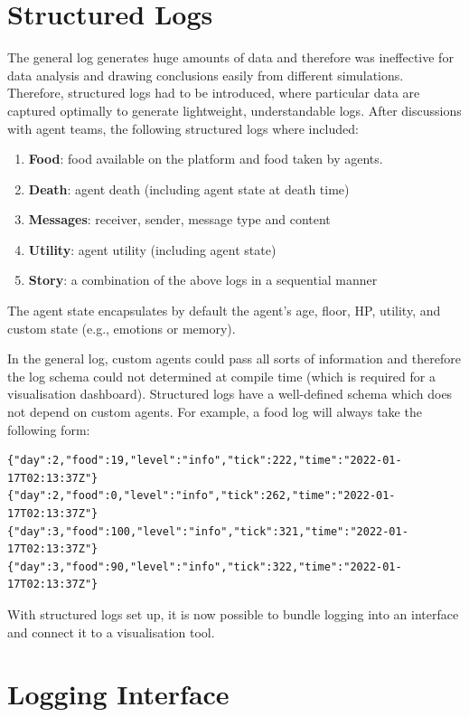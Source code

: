 \begin{multicols}{2}
\section{Structured Logs}

The general log generates huge amounts of data and therefore was ineffective for data analysis and drawing conclusions easily from different simulations. Therefore, structured logs had to be introduced, where particular data are captured optimally to generate lightweight, understandable logs. After discussions with agent teams, the following structured logs where included:

\begin{enumerate}
    \item \textbf{Food}: food available on the platform and food taken by agents.
    \item \textbf{Death}: agent death (including agent state at death time)
    \item \textbf{Messages}: receiver, sender, message type and content
    \item \textbf{Utility}: agent utility (including agent state)
    \item \textbf{Story}: a combination of the above logs in a sequential manner
\end{enumerate}

The agent state encapsulates by default the agent's age, floor, HP, utility, and custom state (e.g., emotions or memory).

In the general log, custom agents could pass all sorts of information and therefore the log schema could not determined at compile time (which is required for a visualisation dashboard). Structured logs have a well-defined schema which does not depend on custom agents. For example, a food log will always take the following form:

\begin{verbatim}
{"day":2,"food":19,"level":"info","tick":222,"time":"2022-01-17T02:13:37Z"}
{"day":2,"food":0,"level":"info","tick":262,"time":"2022-01-17T02:13:37Z"}
{"day":3,"food":100,"level":"info","tick":321,"time":"2022-01-17T02:13:37Z"}
{"day":3,"food":90,"level":"info","tick":322,"time":"2022-01-17T02:13:37Z"}
\end{verbatim}

With structured logs set up, it is now possible to bundle logging into an interface and connect it to a visualisation tool.

\section{Logging Interface}


\end{multicols}
